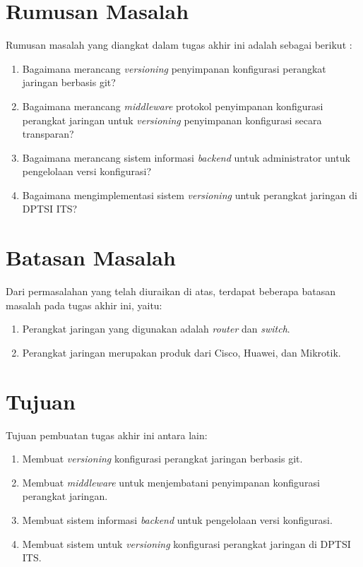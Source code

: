 	\section{Rumusan Masalah}
       	Rumusan masalah yang diangkat dalam tugas akhir ini adalah sebagai berikut :
		\begin{enumerate}
			\item Bagaimana merancang \textit{versioning} penyimpanan konfigurasi perangkat jaringan berbasis git?
			\item Bagaimana merancang \textit{middleware} protokol penyimpanan konfigurasi perangkat jaringan untuk \textit{versioning} penyimpanan konfigurasi secara transparan?
            \item Bagaimana merancang sistem informasi \textit{backend} untuk administrator untuk pengelolaan versi konfigurasi?
            \item Bagaimana mengimplementasi sistem \textit{versioning} untuk perangkat jaringan di DPTSI ITS?
		\end{enumerate}

	\section{Batasan Masalah}
		Dari permasalahan yang telah diuraikan di atas, terdapat beberapa batasan masalah pada tugas akhir ini, yaitu:
		\begin{enumerate}
			\item Perangkat jaringan yang digunakan adalah \textit{router} dan \textit{switch}.
            \item Perangkat jaringan merupakan produk dari Cisco, Huawei, dan Mikrotik.
           
		\end{enumerate}

	\section{Tujuan}
       	Tujuan pembuatan tugas akhir ini antara lain:
        \begin{enumerate}
        	\item Membuat \textit{versioning} konfigurasi perangkat jaringan berbasis git.
        	\item Membuat \textit{middleware} untuk menjembatani penyimpanan konfigurasi perangkat jaringan.
        	\item Membuat sistem informasi \textit{backend} untuk pengelolaan versi konfigurasi.
        	\item Membuat sistem untuk \textit{versioning} konfigurasi perangkat jaringan di DPTSI ITS.
        \end{enumerate}
        
